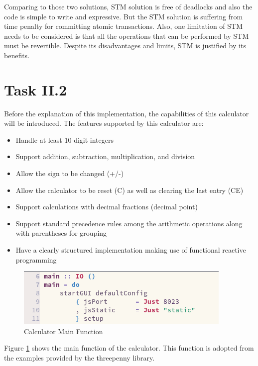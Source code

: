 \documentclass{article}
\begin{document}
\begin{normalsize}
  Comparing to those two solutions, STM solution is free of deadlocks and also the code is simple to write and expressive. But the STM solution is suffering from time penalty for committing atomic transactions. Also, one limitation of STM needs to be considered is that all the operations that can be performed by STM must be revertible. Despite its disadvantages and limits, STM is justified by its benefits.

  \section{Task II.2}
  Before the explanation of this implementation, the capabilities of this calculator will be introduced. The features supported by this calculator are:
  \begin{itemize}
  \item{Handle at least 10-digit integers}
  \item{Support addition, subtraction, multiplication, and division}
  \item{Allow the sign to be changed (+/-)}
  \item{Allow the calculator to be reset (C) as well as clearing the last
      entry (CE)}
  \item{Support calculations with decimal fractions (decimal point)}
  \item{Support standard precedence rules among the arithmetic operations
  along with parentheses for grouping}
  \item{Have a clearly structured implementation making use of functional
      reactive programming}
  \end{itemize}

  
  \begin{figure}[H]
    \centering
    \centerline{\includegraphics[scale=0.4]{calcmain}}
    \caption{Calculator Main Function}
    \label{fig:calcmain}
  \end{figure}

  Figure \ref{fig:calcmain} shows the main function of the calculator. This function is adopted from the examples provided by the threepenny library.

    \begin{figure}[H]


\end{figure}
\end{normalsize}
\end{document}
